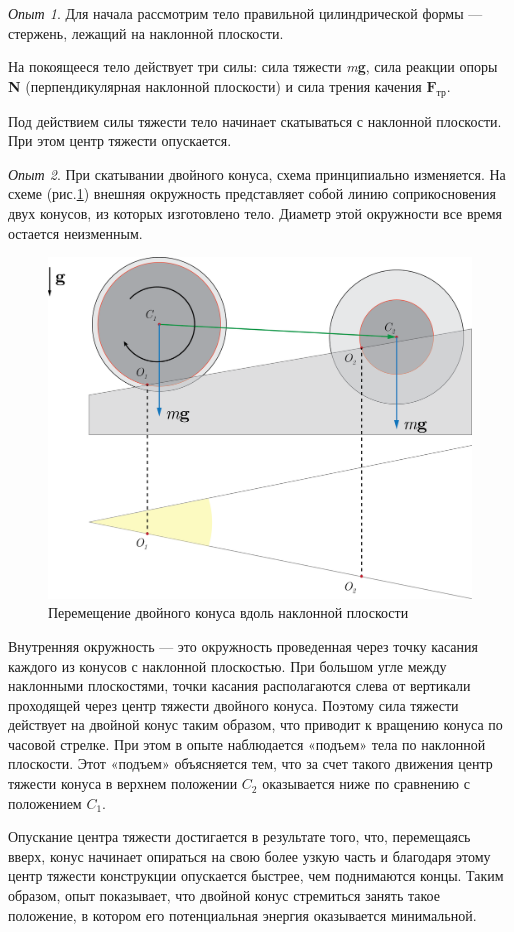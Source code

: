 \documentclass[All.tex]{subfiles}
\begin{document}
	\textit{Опыт 1}. Для начала рассмотрим тело правильной цилиндрической формы  — стержень, лежащий на наклонной плоскости.
	
	На покоящееся тело действует три силы: сила тяжести \textit{m}\textbf{g}, сила реакции опоры \textbf{N} (перпендикулярная наклонной плоскости) и сила трения качения $ \textbf{F}_{\text{тр}} $.
	
	Под действием силы тяжести тело начинает скатываться с наклонной плоскости.
	При этом центр тяжести опускается.
	
	\textit{Опыт 2}. При скатывании двойного конуса, схема принципиально изменяется.
	На схеме (рис.\ref{center-4}) внешняя окружность представляет собой линию соприкосновения двух конусов, из которых изготовлено тело.
	Диаметр этой окружности все время остается неизменным.
			\begin{figure}[H] 	
		\centering 	
		\includegraphics[width=0.75\linewidth]{center-4.png}
		\caption{Перемещение двойного конуса вдоль наклонной плоскости}
		\label{center-4}
	\end{figure}

	Внутренняя окружность — это окружность проведенная через точку касания каждого из конусов с наклонной плоскостью.
	 При большом угле между наклонными плоскостями, точки касания располагаются слева от вертикали проходящей через центр тяжести двойного конуса. Поэтому сила тяжести действует на двойной конус таким образом, что приводит к вращению конуса по часовой стрелке. 
	 При этом в опыте наблюдается «подъем» тела по наклонной плоскости.
	 Этот «подъем» объясняется тем, что за счет такого движения центр тяжести конуса в верхнем положении $ C_{2} $ оказывается ниже по сравнению с положением $ C_{1} $.

	Опускание центра тяжести достигается в результате того, что, перемещаясь вверх, конус начинает опираться на свою более узкую часть и благодаря этому центр тяжести конструкции опускается быстрее, чем поднимаются концы.
	Таким образом, опыт показывает, что двойной конус стремиться занять такое положение, в котором его потенциальная энергия оказывается минимальной.
	
\end{document}
